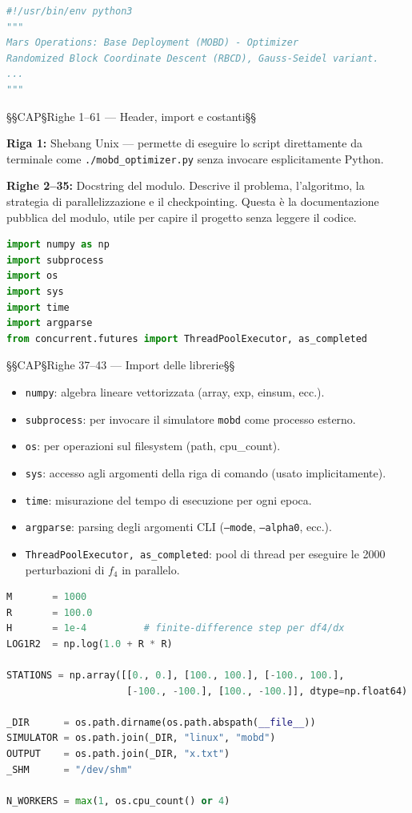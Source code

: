 \documentclass[12pt,a4paper]{article}
\theoremstyle{definition}
\begin{document}
\begin{lstlisting}[language=Python]
#!/usr/bin/env python3
"""
Mars Operations: Base Deployment (MOBD) - Optimizer
Randomized Block Coordinate Descent (RBCD), Gauss-Seidel variant.
...
"""
\end{lstlisting}

§§CAP§Righe 1–61 — Header, import e costanti§§



\textbf{Riga 1:} Shebang Unix — permette di eseguire lo script direttamente da terminale
come \texttt{./mobd\_optimizer.py} senza invocare esplicitamente Python.

\textbf{Righe 2–35:} Docstring del modulo. Descrive il problema, l'algoritmo, la strategia
di parallelizzazione e il checkpointing. Questa è la documentazione pubblica del modulo,
utile per capire il progetto senza leggere il codice.

\begin{lstlisting}[language=Python]
import numpy as np
import subprocess
import os
import sys
import time
import argparse
from concurrent.futures import ThreadPoolExecutor, as_completed
\end{lstlisting}

§§CAP§Righe 37–43 — Import delle librerie§§



\begin{itemize}[nosep]
  \item \texttt{numpy}: algebra lineare vettorizzata (array, exp, einsum, ecc.).
  \item \texttt{subprocess}: per invocare il simulatore \texttt{mobd} come processo esterno.
  \item \texttt{os}: per operazioni sul filesystem (path, cpu\_count).
  \item \texttt{sys}: accesso agli argomenti della riga di comando (usato implicitamente).
  \item \texttt{time}: misurazione del tempo di esecuzione per ogni epoca.
  \item \texttt{argparse}: parsing degli argomenti CLI (\texttt{--mode}, \texttt{--alpha0}, ecc.).
  \item \texttt{ThreadPoolExecutor, as\_completed}: pool di thread per eseguire le 2000
        perturbazioni di $f_4$ in parallelo.
\end{itemize}

\begin{lstlisting}[language=Python]
M       = 1000
R       = 100.0
H       = 1e-4          # finite-difference step per df4/dx
LOG1R2  = np.log(1.0 + R * R)

STATIONS = np.array([[0., 0.], [100., 100.], [-100., 100.],
                     [-100., -100.], [100., -100.]], dtype=np.float64)

_DIR      = os.path.dirname(os.path.abspath(__file__))
SIMULATOR = os.path.join(_DIR, "linux", "mobd")
OUTPUT    = os.path.join(_DIR, "x.txt")
_SHM      = "/dev/shm"

N_WORKERS = max(1, os.cpu_count() or 4)
\end{lstlisting}
\end{document}
